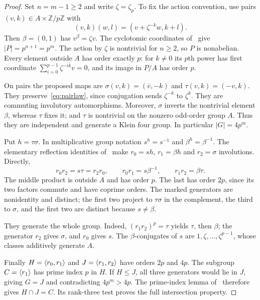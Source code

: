 \begin{proof}
Set $n=m-1\geq2$ and write $\zeta=\zeta_p$. To fix the action
convention, use pairs $(v,k)\in A\times\mathbb Z/p\mathbb Z$ with
\begin{equation}\label{eq:pairlaw}
 (v,k)(w,l)=(v+\zeta^{-k}w,k+l).
\end{equation}
Then $\beta=(0,1)$ has $v^\beta=\zeta v$.
The cyclotomic coordinates of~\cite{UF} give $|P|=p^{n+1}=p^m$.
The action by $\zeta$ is nontrivial for $n\geq2$, so $P$ is
nonabelian. Every element outside $A$ has order exactly $p$:
for $k\ne0$ its $p$th power has first coordinate
$\sum_{i=0}^{p-1}\zeta^{-ik}v=0$, and its image in $P/A$ has
order $p$.

On pairs the proposed maps are
$\sigma(v,k)=(\overline v,-k)$ and $\tau(v,k)=(-v,k)$.
They preserve~\eqref{eq:pairlaw}, since conjugation sends
$\zeta^{-k}$ to $\zeta^k$. They are commuting involutory
automorphisms. Moreover, $\sigma$ inverts the nontrivial element
$\beta$, whereas $\tau$ fixes it; and $\tau$ is nontrivial on
the nonzero odd-order group $A$. Thus they are independent and
generate a Klein four group. In particular $|G|=4p^m$.

Put $h=\tau\sigma$. In multiplicative group notation
$s^h=s^{-1}$ and $\beta^h=\beta^{-1}$. The elementary reflection
identities of~\cite{UF} make $r_0=sh$, $r_1=\beta h$ and
$r_2=\sigma$ involutions. Directly,
\[
 r_0r_2=s\tau=r_2r_0,\qquad
 r_0r_1=s\beta^{-1},\qquad r_1r_2=\beta\tau.
\]
The middle product is outside $A$ and has order $p$.
The last has order $2p$, since its two factors commute and have
coprime orders. The marked generators are nonidentity and distinct;
the first two project to $\tau\sigma$ in the complement, the third
to $\sigma$, and the first two are distinct because $s\ne\beta$.

They generate the whole group. Indeed,
$(r_1r_2)^p=\tau$ yields $\tau$, then $\beta$; the generator
$r_2$ gives $\sigma$, and $r_0$ gives $s$. The
$\beta$-conjugates of $s$ are $1,\zeta,\ldots,\zeta^{p-1}$,
whose classes additively generate $A$.

Finally $H=\langle r_0,r_1\rangle$ and $J=\langle r_1,r_2\rangle$ have
orders $2p$ and $4p$. The subgroup $C=\langle r_1\rangle$ has prime
index $p$ in $H$. If $H\leq J$, all three generators would lie
in $J$, giving $G=J$ and contradicting $4p^m>4p$.
The prime-index lemma of~\cite{UF} therefore gives $H\cap J=C$.
Its rank-three test proves the full intersection property.
\end{proof}

